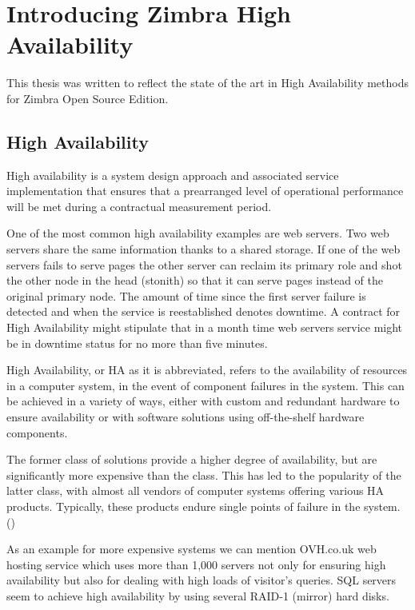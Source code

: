 

\chapter{Introducing Zimbra High Availability}
This thesis was written to reflect the state of the art in High Availability methods for Zimbra Open Source Edition.  

\section {High Availability}
High availability is a system design approach and associated service implementation that ensures that a prearranged level of operational performance will be met during a contractual measurement period.

One of the most common high availability examples are web servers. Two web servers share the same information thanks to a shared storage. If one of the web servers fails to serve pages the other server can reclaim its primary role and shot the other node in the head (stonith) so that it can serve pages instead of the original primary node. The amount of time since the first server failure is detected and when the service is reestablished denotes downtime. A contract for High Availability might stipulate that in a month time web servers service might be in downtime status for no more than five minutes.

High Availability, or HA as it is abbreviated, refers to the availability of resources in a computer system, in the event of component failures in the system. This can be achieved in a variety of ways, either with custom and redundant hardware to ensure availability or with software solutions using off-the-shelf hardware components.

The former class of solutions provide a higher degree of availability, but are significantly more expensive than the class. This has led to the popularity of the latter class, with almost all vendors of computer systems offering various HA products. Typically, these products endure single points of failure in the system. (\cite{TaskForceHA})

As an example for more expensive systems we can mention OVH.co.uk web hosting service which uses more than 1,000 servers not only for ensuring high availability but also for dealing with high loads of visitor's queries. SQL servers seem to achieve high availability by using several RAID-1 (mirror) hard disks.

